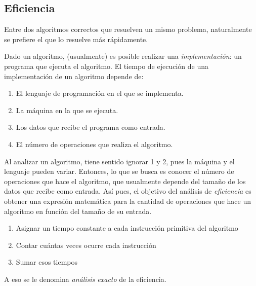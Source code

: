 \subsection{Eficiencia}

Entre dos algoritmos correctos que resuelven un mismo problema, naturalmente se prefiere el que lo resuelve más rápidamente.

Dado un algoritmo, (usualmente) es posible realizar una \emph{implementación}: un programa que ejecuta el algoritmo. El tiempo de ejecución de una implementación de un algoritmo depende de:
\begin{enumerate}
  \item El lenguaje de programación en el que se implementa.
  \item La máquina en la que se ejecuta.
  \item Los datos que recibe el programa como entrada.
  \item El número de operaciones que realiza el algoritmo.
\end{enumerate}

Al analizar un algoritmo, tiene sentido ignorar 1 y 2, pues la máquina y el lenguaje pueden variar. Entonces, lo que se busca es conocer el número de operaciones que hace el algoritmo, que usualmente depende del tamaño de los datos que recibe como entrada. Así pues, el objetivo del análisis de \emph{eficiencia} es obtener una expresión matemática para la cantidad de operaciones que hace un algoritmo en función del tamaño de su entrada.

\begin{enumerate} 
  \item Asignar un tiempo constante a cada instrucción primitiva del algoritmo
  \item Contar cuántas veces ocurre cada instrucción
  \item Sumar esos tiempos
\end{enumerate}
A eso se le denomina \emph{análisis exacto} de la eficiencia.

